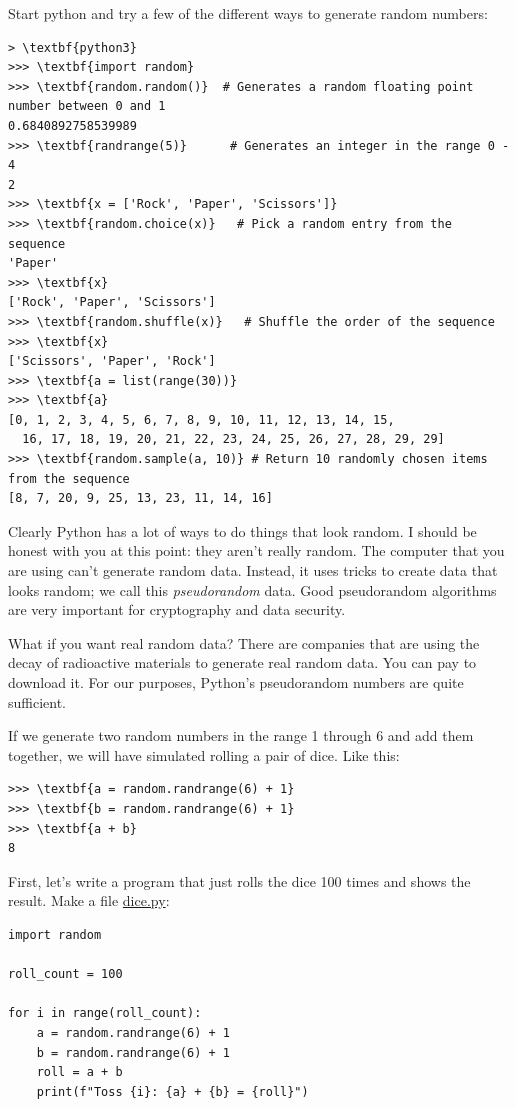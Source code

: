 Start python and try a few of the different ways to generate random numbers:
\begin{Verbatim}[commandchars=\\\{\}]
> \textbf{python3}
>>> \textbf{import random}
>>> \textbf{random.random()}  # Generates a random floating point number between 0 and 1
0.6840892758539989
>>> \textbf{randrange(5)}      # Generates an integer in the range 0 - 4
2
>>> \textbf{x = ['Rock', 'Paper', 'Scissors']}
>>> \textbf{random.choice(x)}   # Pick a random entry from the sequence
'Paper'
>>> \textbf{x}
['Rock', 'Paper', 'Scissors'] 
>>> \textbf{random.shuffle(x)}   # Shuffle the order of the sequence
>>> \textbf{x}
['Scissors', 'Paper', 'Rock']
>>> \textbf{a = list(range(30))}
>>> \textbf{a}
[0, 1, 2, 3, 4, 5, 6, 7, 8, 9, 10, 11, 12, 13, 14, 15,
  16, 17, 18, 19, 20, 21, 22, 23, 24, 25, 26, 27, 28, 29, 29]
>>> \textbf{random.sample(a, 10)} # Return 10 randomly chosen items from the sequence
[8, 7, 20, 9, 25, 13, 23, 11, 14, 16]
\end{Verbatim}
Clearly Python has a lot of ways to do things that look random. I
should be honest with you at this point: they aren't really
random. The computer that you are using can't generate random
data. Instead, it uses tricks to create data that looks random; we
call this \textit{pseudorandom} data. Good pseudorandom algorithms are
very important for cryptography and data security.

What if you want real random data? There are companies that are using
the decay of radioactive materials to generate real random data. You
can pay to download it. For our purposes, Python's pseudorandom
numbers are quite sufficient.

If we generate two random numbers in the range 1 through 6 and add them together, we
will have simulated rolling a pair of dice. Like this:

\begin{Verbatim}[commandchars=\\\{\}]
>>> \textbf{a = random.randrange(6) + 1}
>>> \textbf{b = random.randrange(6) + 1}
>>> \textbf{a + b}
8
\end{Verbatim}

First, let's write a program that just rolls the dice 100 times and shows the result. Make a file \url{dice.py}:
\begin{Verbatim}
import random

roll_count = 100

for i in range(roll_count):
    a = random.randrange(6) + 1
    b = random.randrange(6) + 1
    roll = a + b
    print(f"Toss {i}: {a} + {b} = {roll}")
\end{Verbatim}

